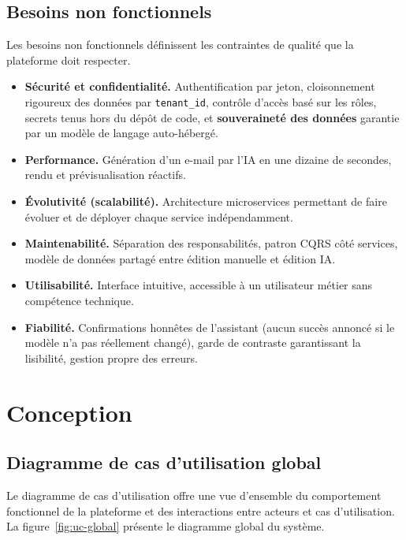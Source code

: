 \subsection{Besoins non fonctionnels}
Les besoins non fonctionnels définissent les contraintes de qualité que la
plateforme doit respecter.

\begin{itemize}[leftmargin=1.4cm]
  \item \textbf{Sécurité et confidentialité.} Authentification par jeton,
  cloisonnement rigoureux des données par \texttt{tenant\_id}, contrôle
  d'accès basé sur les rôles, secrets tenus hors du dépôt de code, et
  \textbf{souveraineté des données} garantie par un modèle de langage
  auto-hébergé.
  \item \textbf{Performance.} Génération d'un e-mail par l'IA en une dizaine
  de secondes, rendu et prévisualisation réactifs.
  \item \textbf{Évolutivité (scalabilité).} Architecture microservices
  permettant de faire évoluer et de déployer chaque service
  indépendamment.
  \item \textbf{Maintenabilité.} Séparation des responsabilités, patron
  CQRS côté services, modèle de données partagé entre édition manuelle et
  édition IA.
  \item \textbf{Utilisabilité.} Interface intuitive, accessible à un
  utilisateur métier sans compétence technique.
  \item \textbf{Fiabilité.} Confirmations honnêtes de l'assistant (aucun
  succès annoncé si le modèle n'a pas réellement changé), garde de
  contraste garantissant la lisibilité, gestion propre des erreurs.
\end{itemize}

\section{Conception}

\subsection{Diagramme de cas d'utilisation global}
Le diagramme de cas d'utilisation offre une vue d'ensemble du comportement
fonctionnel de la plateforme et des interactions entre acteurs et cas
d'utilisation. La figure~\ref{fig:uc-global} présente le diagramme global du
système.


